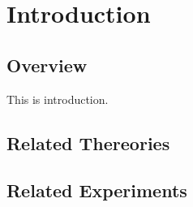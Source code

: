 \chapter{Introduction}

\section{Overview}
This is introduction.

\section{Related Thereories}

\section{Related Experiments}

